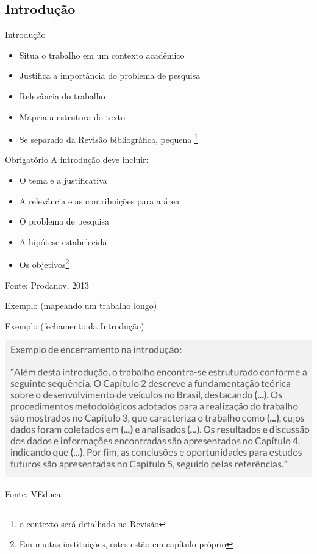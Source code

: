 \documentclass{beamer}
\begin{document}
\subsection{Introdução}

\begin{frame}{Introdução}
  \begin{itemize}
    \footnotesize
  \item Situa o trabalho em um contexto acadêmico
  \bigskip
  \item Justifica a importância do problema de pesquisa
  \bigskip
  \item Relevância do trabalho
  \bigskip
  \item Mapeia a estrutura do texto
  \bigskip
  \item Se separado da Revisão bibliográfica, pequena \footnote{o
      contexto será detalhado na Revisão}
  \end{itemize}
\end{frame}

\begin{frame}{Obrigatório}
  \scriptsize
  A introdução deve incluir:
  \bigskip
  \begin{itemize}
    \footnotesize
  \item O tema e a justificativa
  \bigskip
  \item A relevância e as contribuições para a área
  \bigskip
  \item O problema de pesquisa
  \bigskip
  \item A hipótese estabelecida
  \bigskip
  \item Os objetivos\footnote{Em muitas instituições, estes estão em capítulo próprio}
  \end{itemize}

  \vfill
  \scriptsize
  Fonte: Prodanov, 2013
\end{frame}

\begin{frame}{Exemplo (mapeando um trabalho longo)}
  \begin{exampleblock}{Exemplo (fechamento da Introdução)}
    \begin{center}
      \includegraphics[width=\textwidth]{EstruturaI/exemplo-introducao}
    \end{center}
  \end{exampleblock}

  \vfill
  \scriptsize
  Fonte: VEduca
\end{frame}
\end{document}
